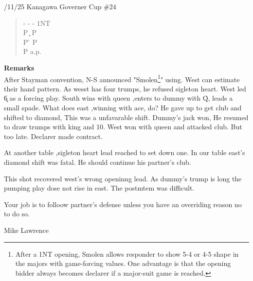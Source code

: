 \vspace{0.5cm}
/11/25 Kanagawa Governer Cup \#24
\begin{quote}
%
  {}%
  {}
  {}%
  {}%
\end{quote}
\begin{quote}
\begin{bidding}
- \> - \> -  \> 1NT \\
P \c \> P \d \\
P \h \> P \s \\
P \s \> a.p.
\end{bidding}
\end{quote}
{\bf Remarks}\\

After Stayman convention, N-S announced "Smolen\footnote{
After a 1NT opening, Smolen allows responder to show 5-4 or 4-5 shape in the majors with game-forcing values. One advantage is that the opening bidder always becomes declarer if a major-suit game is reached.
}" using.
West can estimate their hand pattern. As wesst has four
trumps, he refused sigleton heart. 
West led \c 6 as a forcing play. South wins with queen ,enters
to dummy with \h Q, leads a small spade. What does 
east ,winning with ace, do? He gave up to get club and
shifted to diamond, This was a unfavarable shift. Dummy's
jack won, He resumed to draw trumps with king and 10.
West won with queen and attacked club. But too late.
Declarer made contract.

At another table ,sigleton heart lead reached to
set down one. In our table east's diamond shift was
fatal. He should continue his partner's club.

This shot recovered west's wrong openinng lead.
As dummy's trump is long the pumping play dose
not rise in east. The postmtem was difficult.

Your job is to folloow partner's defense unless you have an overriding reason no to do so.\\
\begin{flushright}{
Mike Lawrence}
\end{flushright}


